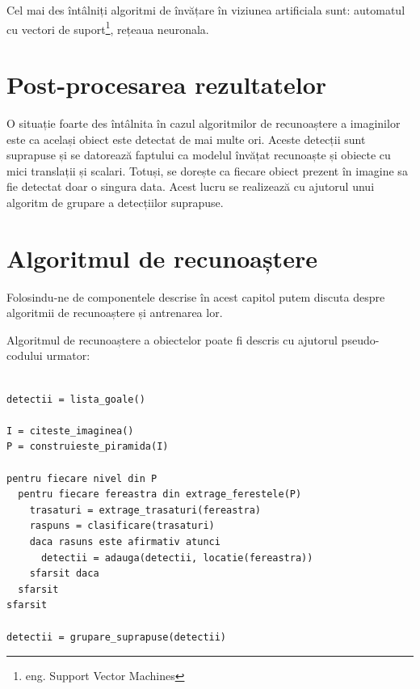 Cel mai des întâlniți algoritmi de învățare în viziunea artificiala sunt: automatul cu vectori de suport\footnote{eng. Support Vector Machines}, rețeaua neuronala.

\pagebreak
\section{Post-procesarea rezultatelor}

O situație foarte des întâlnita în cazul algoritmilor de recunoaștere a imaginilor este ca același obiect este detectat de mai multe ori.
Aceste detecții sunt suprapuse și se datorează faptului ca modelul învățat recunoaște și obiecte cu mici translații și scalari.
Totuși, se dorește ca fiecare obiect prezent în imagine sa fie detectat doar o singura data.
Acest lucru se realizează cu ajutorul unui algoritm de grupare a detecțiilor suprapuse.

\pagebreak
\section{Algoritmul de recunoaștere}

Folosindu-ne de componentele descrise în acest capitol putem discuta despre algoritmii de recunoaștere și antrenarea lor.

Algoritmul de recunoaștere a obiectelor poate fi descris cu ajutorul pseudo-codului urmator:
\begin{mdframed}
\begin{verbatim}

detectii = lista_goale()

I = citeste_imaginea()
P = construieste_piramida(I)

pentru fiecare nivel din P
  pentru fiecare fereastra din extrage_ferestele(P)
    trasaturi = extrage_trasaturi(fereastra)
    raspuns = clasificare(trasaturi)
    daca rasuns este afirmativ atunci
      detectii = adauga(detectii, locatie(fereastra))
    sfarsit daca
  sfarsit
sfarsit

detectii = grupare_suprapuse(detectii)

\end{verbatim}
\end{mdframed}

